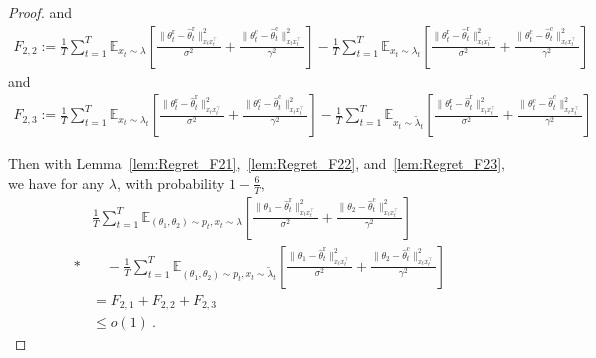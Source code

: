 \documentclass[accepted]{uai2025} %
\theoremstyle{plain}
\theoremstyle{definition}
\theoremstyle{remark}
\newcommand{\hthetact}{\hat{\theta}_t^{\mathrm{c}}}
\newcommand{\hthetart}{\hat{\theta}_t^{\mathrm{r}}}
\begin{document}
\begin{proof}
and
\begin{align*}
    F_{2,2}:=\frac{1}{T} 
\sum_{t=1}^{T} \mathbb{E}_{ x_t\sim \lambda} 
\left[\frac{\|\theta_t^\mathrm{r} - \hthetart\|_{x_t x_t^\top}^2}{\sigma^2} 
+ \frac{\|\theta_t^\mathrm{c} - \hthetact\|_{x_t x_t^\top}^2}{\gamma^2}\right] 
- \frac{1}{T} 
\sum_{t=1}^{T} \mathbb{E}_{ x_t\sim \lambda_t} 
\left[\frac{\|\theta_t^\mathrm{r} - \hthetart\|_{x_t x_t^\top}^2}{\sigma^2} 
+ \frac{\|\theta_t^\mathrm{c} - \hthetact\|_{x_t x_t^\top}^2}{\gamma^2}\right]
\end{align*}
and
\begin{align*}
    F_{2,3}:=\frac{1}{T} 
\sum_{t=1}^{T} \mathbb{E}_{ x_t\sim \lambda_t} 
\left[\frac{\|\theta_t^\mathrm{r} - \hthetart\|_{x_t x_t^\top}^2}{\sigma^2} 
+ \frac{\|\theta_t^\mathrm{c} - \hthetact\|_{x_t x_t^\top}^2}{\gamma^2} \right]
-
\frac{1}{T} \sum_{t=1}^{T} \mathbb{E}_{ x_t\sim \tilde{\lambda}_t} 
\left[\frac{\|\theta_t^\mathrm{r} - \hthetart\|_{x_t x_t^\top}^2}{\sigma^2} 
+ \frac{\|\theta_t^\mathrm{c} - \hthetact\|_{x_t x_t^\top}^2}{\gamma^2}\right]
\end{align*}

Then with Lemma~\ref{lem:Regret_F21},~\ref{lem:Regret_F22}, and~\ref{lem:Regret_F23}, we have for any $\lambda$, with probability $1-\frac{6}{T}$,
\begin{align*}
    &\frac{1}{T} 
\sum_{t=1}^{T} \mathbb{E}_{(\theta_1, \theta_2) \sim p_t, x_t\sim \lambda} 
\left[ \frac{\|\theta_1 - \hthetart\|_{x_t x_t^\top}^2}{\sigma^2} 
+ \frac{\|\theta_2 - \hthetact\|_{x_t x_t^\top}^2}{\gamma^2}  \right]  \\*
&\quad
- \frac{1}{T} \sum_{t=1}^{T} \mathbb{E}_{(\theta_1, \theta_2) \sim p_t, x_t\sim \tilde{\lambda}_t} 
\left[\frac{\|\theta_1 - \hthetart\|_{x_t x_t^\top}^2}{\sigma^2} 
+ \frac{\|\theta_2 - \hthetact\|_{x_t x_t^\top}^2}{\gamma^2}\right]
\\&=F_{2,1}+F_{2,2}+F_{2,3}
\\&\le o(1)~.
\end{align*}


\end{proof}
\end{document}
